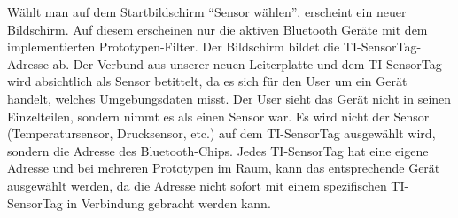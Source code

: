 Wählt man auf dem Startbildschirm ``Sensor wählen'', erscheint ein neuer Bildschirm. Auf diesem erscheinen nur die aktiven Bluetooth Geräte mit dem implementierten Prototypen-Filter. Der Bildschirm bildet die TI-SensorTag-Adresse ab. Der Verbund aus unserer neuen Leiterplatte und dem TI-SensorTag wird absichtlich als Sensor betittelt, da es sich für den User um ein Gerät handelt, welches Umgebungsdaten misst. Der User sieht das Gerät nicht in seinen Einzelteilen, sondern nimmt es als einen Sensor war. Es wird nicht der Sensor (Temperatursensor, Drucksensor, etc.) auf dem TI-SensorTag ausgewählt wird, sondern die Adresse des Bluetooth-Chips. Jedes TI-SensorTag hat eine eigene Adresse und bei mehreren Prototypen im Raum, kann das entsprechende Gerät ausgewählt werden, da die Adresse nicht sofort mit einem spezifischen TI-SensorTag in Verbindung gebracht werden kann.

